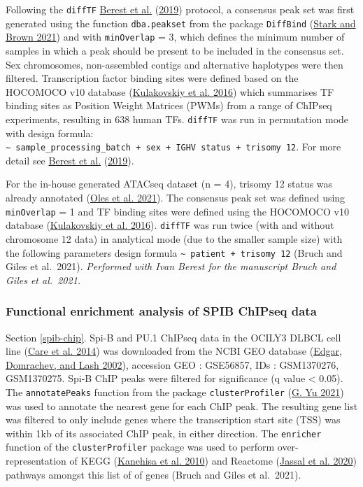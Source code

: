 \documentclass[11pt, a4paper, twosided]{book}
\begin{document}
Following the \texttt{diffTF} \protect\hyperlink{ref-Berest2019}{Berest et al.} (\protect\hyperlink{ref-Berest2019}{2019}) protocol, a consensus peak set was first generated using the function \texttt{dba.peakset} from the package \texttt{DiffBind} (\protect\hyperlink{ref-R-DiffBind}{Stark and Brown 2021}) and with \texttt{minOverlap} = 3, which defines the minimum number of samples in which a peak should be present to be included in the consensus set. Sex chromosomes, non-assembled contigs and alternative haplotypes were then filtered. Transcription factor binding sites were defined based on the HOCOMOCO v10 database (\protect\hyperlink{ref-HOCOMOCO}{Kulakovskiy et al. 2016}) which summarises TF binding sites as Position Weight Matrices (PWMs) from a range of ChIPseq experiments, resulting in 638 human TFs. \texttt{diffTF} was run in permutation mode with design formula: \texttt{∼\ sample\_processing\_batch\ +\ sex\ +\ IGHV\ status\ +\ trisomy\ 12}. For more detail see \protect\hyperlink{ref-Berest2019}{Berest et al.} (\protect\hyperlink{ref-Berest2019}{2019}).

For the in-house generated ATACseq dataset (n = 4), trisomy 12 status was already annotated (\protect\hyperlink{ref-R-BloodCancerMultiOmics2017}{Oles et al. 2021}). The consensus peak set was defined using \texttt{minOverlap} = 1 and TF binding sites were defined using the HOCOMOCO v10 database (\protect\hyperlink{ref-HOCOMOCO}{Kulakovskiy et al. 2016}). \texttt{diffTF} was run twice (with and without chromosome 12 data) in analytical mode (due to the smaller sample size) with the following parameters design formula \texttt{\textasciitilde{}\ patient\ +\ trisomy\ 12} (Bruch and Giles et al.~2021). \emph{Performed with Ivan Berest for the manuscript Bruch and Giles et al.~2021.}

\hypertarget{functional-enrichment-analysis-of-spib-chipseq-data}{%
\subsubsection{Functional enrichment analysis of SPIB ChIPseq data}\label{functional-enrichment-analysis-of-spib-chipseq-data}}

Section \ref{spib-chip}. Spi-B and PU.1 ChIPseq data in the OCILY3 DLBCL cell line (\protect\hyperlink{ref-Care2014}{Care et al. 2014}) was downloaded from the NCBI GEO database (\protect\hyperlink{ref-Edgar2002}{Edgar, Domrachev, and Lash 2002}), accession GEO : GSE56857, IDs : GSM1370276, GSM1370275. Spi-B ChIP peaks were filtered for significance (q value \textless{} 0.05). The \texttt{annotatePeaks} function from the package \texttt{clusterProfiler} (\protect\hyperlink{ref-R-clusterProfiler}{G. Yu 2021}) was used to annotate the nearest gene for each ChIP peak. The resulting gene list was filtered to only include genes where the transcription start site (TSS) was within 1kb of its associated ChIP peak, in either direction. The \texttt{enricher} function of the \texttt{clusterProfiler} package was used to perform over-representation of KEGG (\protect\hyperlink{ref-KEGG}{Kanehisa et al. 2010}) and Reactome (\protect\hyperlink{ref-Reactome}{Jassal et al. 2020}) pathways amongst this list of of genes (Bruch and Giles et al.~2021).
\end{document}
